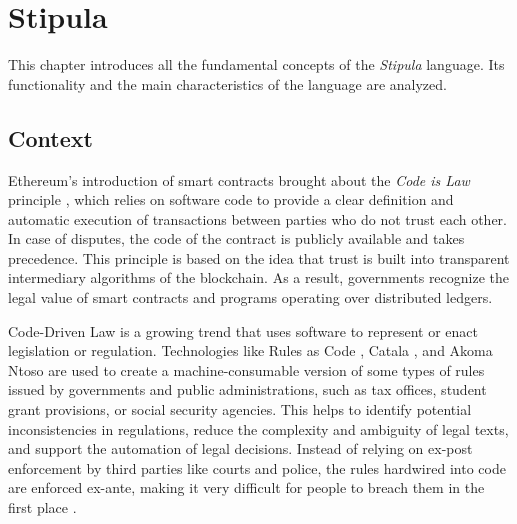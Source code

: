 
\chapter{Stipula}
\label{cap:stipula}

This chapter introduces all the fundamental concepts of the \textit{Stipula} language. Its functionality 
and the main characteristics of the language are analyzed.


\section{Context}

Ethereum's introduction of smart contracts brought about the \textit{Code is Law} principle 
\autocite{article:code-is-law-principle}, which relies on software code to provide a clear definition and 
automatic execution of transactions between parties who do not trust each other. In case of disputes, the 
code of the contract is publicly available and takes precedence. This principle is based on the idea that 
trust is built into transparent intermediary algorithms of the blockchain. As a result, governments 
recognize the legal value of smart contracts and programs operating over distributed ledgers.

Code-Driven Law \autocite{site:code-driven-law} is a growing trend that uses software to represent or enact 
legislation or regulation. Technologies like Rules as Code \autocite{site:rulse-as-code}, Catala 
\autocite{site:catala}, and Akoma Ntoso \autocite{site:akoma-ntoso} are used to create a machine-consumable 
version of some types of rules issued by governments and public administrations, such as tax offices, 
student grant provisions, or social security agencies. This helps to identify potential inconsistencies in 
regulations, reduce the complexity and ambiguity of legal texts, and support the automation of legal 
decisions. Instead of relying on ex-post enforcement by third parties like courts and police, the rules 
hardwired into code are enforced ex-ante, making it very difficult for people to breach them in the first 
place \autocite{article:from-code-is-law-to-law-is-code}.

